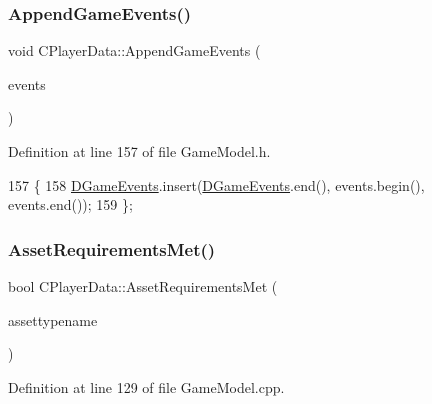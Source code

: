 \subsubsection{\texorpdfstring{Append\+Game\+Events()}{AppendGameEvents()}}
{\footnotesize\ttfamily void C\+Player\+Data\+::\+Append\+Game\+Events (\begin{DoxyParamCaption}\item[{const std\+::vector$<$ \hyperlink{structSGameEvent}{S\+Game\+Event} $>$ \&}]{events }\end{DoxyParamCaption})\hspace{0.3cm}{\ttfamily [inline]}}



Definition at line 157 of file Game\+Model.\+h.


\begin{DoxyCode}
157                                                                     \{
158             \hyperlink{classCPlayerData_a9a7af43e88055d6d1a384a8817a655a0}{DGameEvents}.insert(\hyperlink{classCPlayerData_a9a7af43e88055d6d1a384a8817a655a0}{DGameEvents}.end(), events.begin(), events.end());
159         \};
\end{DoxyCode}
\hypertarget{classCPlayerData_a21238056db09447e0ed054aafbd953c1}{}\label{classCPlayerData_a21238056db09447e0ed054aafbd953c1} 
\subsubsection{\texorpdfstring{Asset\+Requirements\+Met()}{AssetRequirementsMet()}}
{\footnotesize\ttfamily bool C\+Player\+Data\+::\+Asset\+Requirements\+Met (\begin{DoxyParamCaption}\item[{const std\+::string \&}]{assettypename }\end{DoxyParamCaption})}



Definition at line 129 of file Game\+Model.\+cpp.


